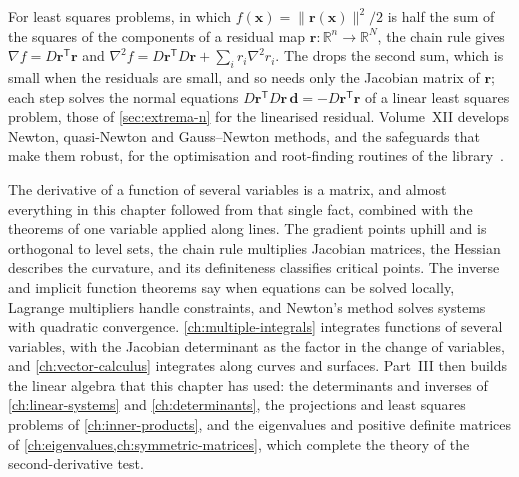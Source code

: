 For least squares problems, in which $f(\mathbf x)=\|\mathbf r(\mathbf x)\|^2/2$ is half the sum of the squares of the components of a residual map $\mathbf r\colon\mathbb R^n\to\mathbb R^N$, the chain rule gives $\nabla f=D\mathbf r^{\mathsf T}\mathbf r$ and $\nabla^2f=D\mathbf r^{\mathsf T}D\mathbf r+\sum_ir_i\nabla^2r_i$. The  drops the second sum, which is small when the residuals are small, and so needs only the Jacobian matrix of $\mathbf r$; each step solves the normal equations $D\mathbf r^{\mathsf T}D\mathbf r\,\mathbf d=-D\mathbf r^{\mathsf T}\mathbf r$ of a linear least squares problem, those of \cref{sec:extrema-n} for the linearised residual. Volume~XII develops Newton, quasi-Newton and Gauss--Newton methods, and the safeguards that make them robust, for the optimisation and root-finding routines of the library~\cite{dennis1996,nocedal2006}.

\bigskip
The derivative of a function of several variables is a matrix, and almost everything in this chapter followed from that single fact, combined with the theorems of one variable applied along lines. The gradient points uphill and is orthogonal to level sets, the chain rule multiplies Jacobian matrices, the Hessian describes the curvature, and its definiteness classifies critical points. The inverse and implicit function theorems say when equations can be solved locally, Lagrange multipliers handle constraints, and Newton's method solves systems with quadratic convergence. \cref{ch:multiple-integrals} integrates functions of several variables, with the Jacobian determinant as the factor in the change of variables, and \cref{ch:vector-calculus} integrates along curves and surfaces. Part~III then builds the linear algebra that this chapter has used: the determinants and inverses of \cref{ch:linear-systems} and \cref{ch:determinants}, the projections and least squares problems of \cref{ch:inner-products}, and the eigenvalues and positive definite matrices of \cref{ch:eigenvalues,ch:symmetric-matrices}, which complete the theory of the second-derivative test.

\chapternotes

